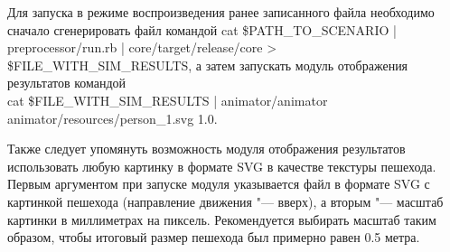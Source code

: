 Для запуска в режиме воспроизведения ранее записанного файла необходимо сначало сгенерировать файл командой
cat \$PATH\_TO\_SCENARIO \-|\- preprocessor/run.rb \-|\- core/target/release/core \->\- \$FILE\_WITH\_SIM\_RESULTS,
а затем запускать модуль отображения результатов командой \\
cat \$FILE\_WITH\_SIM\_RESULTS \-|\- animator/animator \\ animator/resources/person\_1.svg 1.0.

Также следует упомянуть возможность модуля отображения результатов использовать любую картинку в формате SVG в качестве текстуры пешехода.
Первым аргументом при запуске модуля указывается файл в формате SVG с картинкой пешехода (направление движения "--- вверх), а вторым "--- масштаб картинки в миллиметрах на пиксель.
Рекомендуется выбирать масштаб таким образом, чтобы итоговый размер пешехода был примерно равен 0.5 метра.

